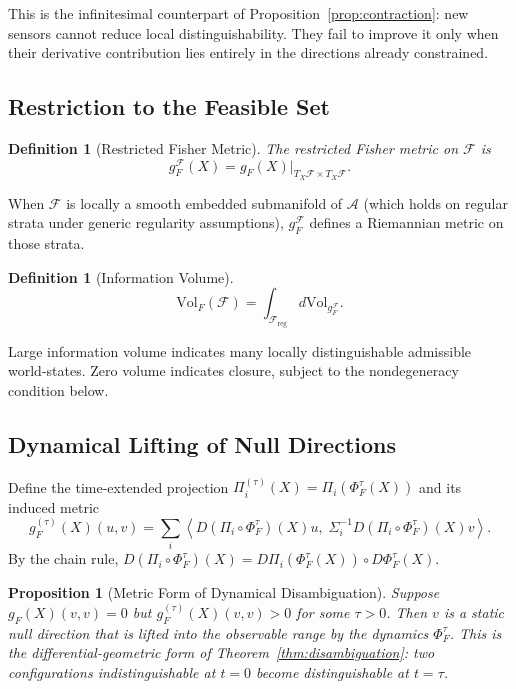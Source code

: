 \documentclass[11pt, oneside]{article}
\newtheorem{proposition}[theorem]{Proposition}
\newtheorem{definition}[theorem]{Definition}
\begin{document}
This is the infinitesimal counterpart of Proposition~\ref{prop:contraction}: new sensors
cannot reduce local distinguishability. They fail to improve it only when their derivative
contribution lies entirely in the directions already constrained.

\subsection{Restriction to the Feasible Set}

\begin{definition}[Restricted Fisher Metric]
The restricted Fisher metric on $\mathcal{F}$ is
\[
g_F^{\mathcal{F}}(X) = g_F(X)\big|_{T_X\mathcal{F} \times T_X\mathcal{F}}.
\]
\end{definition}

When $\mathcal{F}$ is locally a smooth embedded submanifold of $\mathcal{A}$ (which holds
on regular strata under generic regularity assumptions), $g_F^{\mathcal{F}}$ defines a
Riemannian metric on those strata.

\begin{definition}[Information Volume]
\[
\mathrm{Vol}_F(\mathcal{F}) = \int_{\mathcal{F}_{\mathrm{reg}}} d\mathrm{Vol}_{g_F^{\mathcal{F}}}.
\]
\end{definition}

Large information volume indicates many locally distinguishable admissible world-states.
Zero volume indicates closure, subject to the nondegeneracy condition below.

\subsection{Dynamical Lifting of Null Directions}

Define the time-extended projection $\Pi_i^{(\tau)}(X) = \Pi_i(\Phi_F^\tau(X))$ and its
induced metric
\[
g_F^{(\tau)}(X)(u,v)
= \sum_i \left\langle D(\Pi_i \circ \Phi_F^\tau)(X)u,\;
\Sigma_i^{-1} D(\Pi_i \circ \Phi_F^\tau)(X)v \right\rangle.
\]
By the chain rule, $D(\Pi_i \circ \Phi_F^\tau)(X) = D\Pi_i(\Phi_F^\tau(X)) \circ D\Phi_F^\tau(X)$.

\begin{proposition}[Metric Form of Dynamical Disambiguation]
\label{prop:dynamical_lifting}
Suppose $g_F(X)(v,v) = 0$ but $g_F^{(\tau)}(X)(v,v) > 0$ for some $\tau > 0$.
Then $v$ is a static null direction that is lifted into the observable range by the
dynamics $\Phi_F^\tau$. This is the differential-geometric form of
Theorem~\ref{thm:disambiguation}: two configurations indistinguishable at $t = 0$
become distinguishable at $t = \tau$.
\end{proposition}
\end{document}
